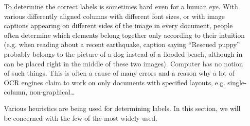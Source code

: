 To determine the correct labels is sometimes hard even for a human eye. With various differently aligned columns with different font sizes, or with image captions appearing on different sides of the image in every document, people often determine which elements belong together only according to their intuition (e.g. when reading about a recent earthquake, caption saying “Rescued puppy” probably belongs to the picture of a dog instead of a flooded beach, although in can be placed right in the middle of these two images). Computer has no notion of such things. This is often a cause of many errors and a reason why a lot of OCR engines claim to work on only documents with specified layouts, e.g. single-column, non-graphical\ldots

Various heuristics are being used for determining labels\cite{logicalLayoutTemplate}. In this section, we will be concerned with the few of the most widely used.

